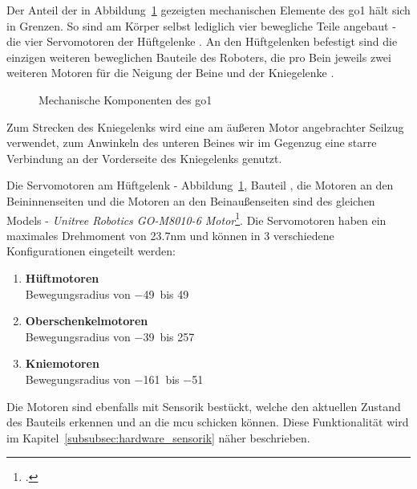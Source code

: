 Der Anteil der in Abbildung~\ref{fig:mechanische_komponenten} gezeigten mechanischen Elemente des \gls{go1} hält sich in Grenzen.
So sind am Körper selbst lediglich vier bewegliche Teile angebaut - die vier Servomotoren
der Hüftgelenke .
An den Hüftgelenken befestigt sind die einzigen weiteren beweglichen Bauteile des Roboters,
die pro Bein jeweils zwei weiteren Motoren für die Neigung der Beine  und der Kniegelenke .
\begin{figure}[h]
    \caption{Mechanische Komponenten des \gls{go1}}\label{fig:mechanische_komponenten}
\end{figure}
Zum Strecken des Kniegelenks wird eine am äußeren Motor angebrachter Seilzug  verwendet,
zum Anwinkeln des unteren Beines wir im Gegenzug eine starre Verbindung  an der Vorderseite des Kniegelenks genutzt.

Die Servomotoren am Hüftgelenk - Abbildung~\ref{fig:mechanische_komponenten}, Bauteil , die Motoren an den Beininnenseiten 
und die Motoren an den Beinaußenseiten  sind des gleichen Models -
\emph{Unitree Robotics GO-M8010-6 Motor}\footcite{go_motor}.
Die Servomotoren  haben ein maximales Drehmoment von \num{23.7}\gls{nm} und können in 3 verschiedene Konfigurationen
eingeteilt werden:
\begin{enumerate}
    \item \textbf{Hüftmotoren}\\
    Bewegungsradius von \num{-49}\textdegree~bis \num{49}\textdegree
    \item \textbf{Oberschenkelmotoren}\\
    Bewegungsradius von \num{-39}\textdegree~bis \num{257}\textdegree
    \item \textbf{Kniemotoren}\\
    Bewegungsradius von \num{-161}\textdegree~bis \num{-51}\textdegree
\end{enumerate}
Die Motoren sind ebenfalls mit Sensorik bestückt, welche den aktuellen Zustand des Bauteils erkennen und
an die \gls{mcu} schicken können.
Diese Funktionalität wird im Kapitel~\ref{subsubsec:hardware_sensorik} näher beschrieben.

